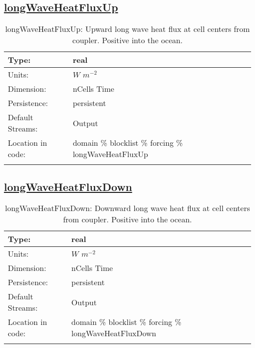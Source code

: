 \subsection[longWaveHeatFluxUp]{\hyperref[sec:var_tab_forcing]{longWaveHeatFluxUp}}
\label{subsec:var_sec_forcing_longWaveHeatFluxUp}
\begin{center}
\begin{longtable}{| p{2.0in} | p{4.0in} |}
        \hline 
        Type: & real \\
        \hline 
        Units: & $W$ $m^{-2}$ \\
        \hline 
        Dimension: & nCells Time \\
        \hline 
        Persistence: & persistent \\
        \hline 
		 Default Streams: & Output  \\
        \hline 
		 Location in code: & domain \% blocklist \% forcing \% longWaveHeatFluxUp \\
		 \hline 
    \caption{longWaveHeatFluxUp: Upward long wave heat flux at cell centers from coupler. Positive into the ocean.}
\end{longtable}
\end{center}
\subsection[longWaveHeatFluxDown]{\hyperref[sec:var_tab_forcing]{longWaveHeatFluxDown}}
\label{subsec:var_sec_forcing_longWaveHeatFluxDown}
\begin{center}
\begin{longtable}{| p{2.0in} | p{4.0in} |}
        \hline 
        Type: & real \\
        \hline 
        Units: & $W$ $m^{-2}$ \\
        \hline 
        Dimension: & nCells Time \\
        \hline 
        Persistence: & persistent \\
        \hline 
		 Default Streams: & Output  \\
        \hline 
		 Location in code: & domain \% blocklist \% forcing \% longWaveHeatFluxDown \\
		 \hline 
    \caption{longWaveHeatFluxDown: Downward long wave heat flux at cell centers from coupler. Positive into the ocean.}
\end{longtable}
\end{center}
